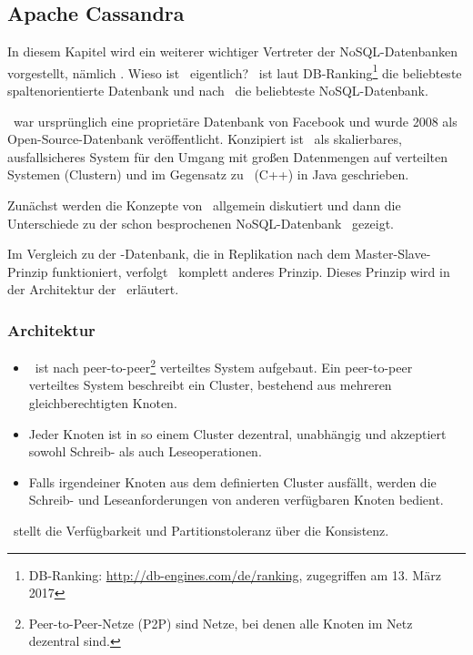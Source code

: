 \subsection{Apache Cassandra}
In diesem Kapitel wird ein weiterer wichtiger Vertreter der NoSQL-Datenbanken vorgestellt, nämlich \cass. Wieso ist \cass\ eigentlich? \cass\ ist laut DB-Ranking\footnote{DB-Ranking: \url{http://db-engines.com/de/ranking}, zugegriffen am 13. März 2017} die beliebteste spaltenorientierte Datenbank und nach \mongo\ die beliebteste NoSQL-Datenbank.

\cass\ war ursprünglich eine proprietäre Datenbank von Facebook und wurde 2008 als Open-Source-Datenbank veröffentlicht. Konzipiert ist \cass\ als skalierbares, ausfallsicheres System für den Umgang mit großen Datenmengen auf verteilten Systemen (Clustern) und im Gegensatz zu \mongo\ (C++) in Java geschrieben.

Zunächst werden die Konzepte von \cass\ allgemein diskutiert und dann die Unterschiede zu der schon besprochenen NoSQL-Datenbank \mongo\ gezeigt.

Im Vergleich zu der \mongo-Datenbank, die in Replikation nach dem Master-Slave-Prinzip funktioniert, verfolgt \cass\ komplett anderes Prinzip. Dieses Prinzip wird in der Architektur der \cass\ erläutert.
\subsubsection{Architektur}
\begin{itemize}
\item \cass\ ist nach peer-to-peer\footnote{Peer-to-Peer-Netze (P2P) sind Netze, bei denen alle Knoten im Netz dezentral sind.} verteiltes System aufgebaut. Ein peer-to-peer verteiltes System beschreibt ein Cluster, bestehend aus mehreren gleichberechtigten Knoten.  
\item Jeder Knoten ist in so einem Cluster dezentral, unabhängig und akzeptiert sowohl Schreib- als auch Leseoperationen.
\item Falls irgendeiner Knoten aus dem definierten Cluster ausfällt, werden die Schreib- und Leseanforderungen von anderen verfügbaren Knoten bedient.
\end{itemize}
\cass\ stellt die Verfügbarkeit und Partitionstoleranz über die Konsistenz.

